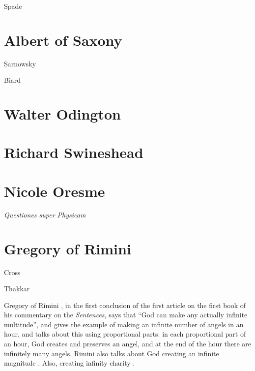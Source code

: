 \documentclass{article}
\begin{document}
Spade \cite[pp.~74--75, 117--123]{spade}

\section{Albert of Saxony}
Sarnowsky \cite{sarnowsky}

Biard \cite{saxe}

\section{Walter Odington}

\section{Richard Swineshead}

\section{Nicole Oresme}
{\em Questiones super Physicam} \cite{oresme2013}


\section{Gregory of Rimini}
Cross \cite{rimini}

Thakkar \cite{thakkar}

Gregory of Rimini  \cite[p.~441]{riminiIII}, in the first conclusion of the first article on the first book of his commentary on the {\em Sentences},
says that ``God can make any actually infinite multitude'', and gives the example
of making an infinite number of angels in an hour, and talks about this using proportional parts: in each proportional part of an
hour, God creates and preserves an angel, and at the end of the hour there are infinitely many angels. Rimini also talks about God
creating an infinite magnitude \cite[p.~445]{riminiIII}. Also, creating infinity charity \cite[pp.~446--447]{riminiIII}.
\end{document}
